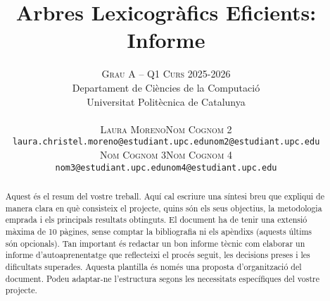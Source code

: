 \documentclass[a4paper]{article}
\title{\textbf{Arbres Lexicogràfics Eficients: Informe}}
\author{
\large
\textsc{Grau A -- Q1 Curs 2025-2026}\\[2mm] 
\normalsize Departament de Ciències de la Computació \\
\normalsize Universitat Politècnica de Catalunya \\[1cm]
%
\begin{tabular}{cc}
{\textsc{Laura Moreno}} & {\textsc{Nom Cognom 2}} \\
\normalsize \texttt{laura.christel.moreno@estudiant.upc.edu} & \normalsize \texttt{nom2@estudiant.upc.edu} \\[4mm]
{\textsc{Nom Cognom 3}} & {\textsc{Nom Cognom 4}} \\
\normalsize \texttt{nom3@estudiant.upc.edu} & \normalsize \texttt{nom4@estudiant.upc.edu} \\
\end{tabular}
}
\date{}
\begin{document}
\maketitle

\begin{abstract}
Aquest és el resum del vostre treball. Aquí cal escriure una síntesi breu que expliqui de manera clara en què consisteix el projecte, quins són els seus objectius, la metodologia emprada i els principals resultats obtinguts.
El document ha de tenir una extensió màxima de 10 pàgines, sense comptar la bibliografia ni els apèndixs (aquests últims són opcionals). Tan important és redactar un bon informe tècnic com elaborar un informe d’autoaprenentatge que reflecteixi el procés seguit, les decisions preses i les dificultats superades.
Aquesta plantilla és només una proposta d’organització del document. Podeu adaptar-ne l’estructura segons les necessitats específiques del vostre projecte.
\end{abstract}

 \newpage
 \newpage
 \newpage
\end{document}
